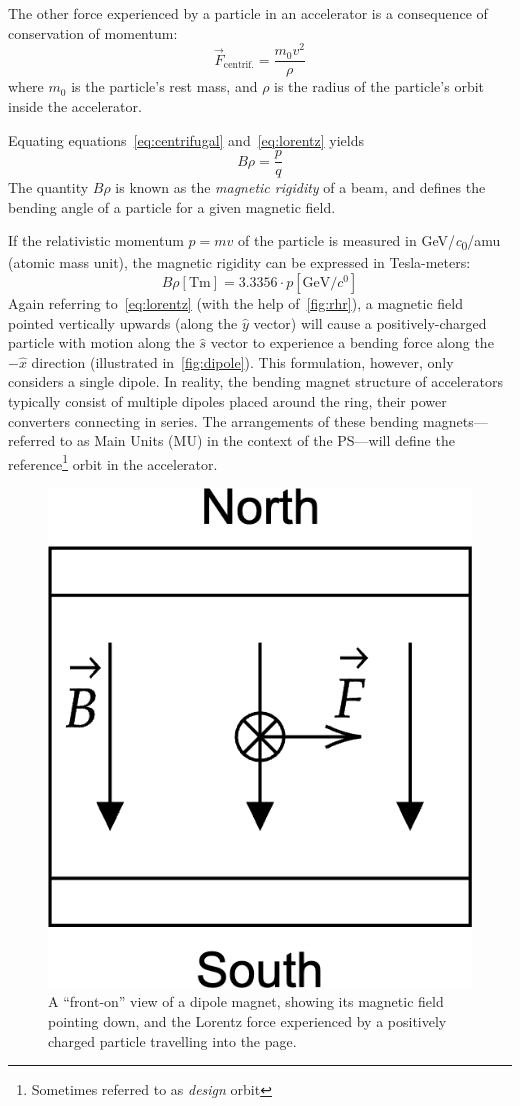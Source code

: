 \documentclass[11pt]{report}
\begin{document}
The other force experienced by a particle in an accelerator is a consequence of conservation of momentum:
\begin{equation}
\vec F_{\text{centrif.}}=\frac{m_0v^2}{\rho}\label{eq:centrifugal}
\end{equation} where $m_0$ is the particle's rest mass, and $\rho$ is the radius of the particle's orbit inside the accelerator.

Equating equations~\ref{eq:centrifugal} and~\ref{eq:lorentz} yields
\begin{equation}
B\rho=\frac pq
\label{eq:brho}
\end{equation}
The quantity $B\rho$ is known as the \textit{magnetic rigidity} of a beam, and defines the bending angle of a particle for a given magnetic field. 

If the relativistic momentum $p=mv$ of the particle is measured in \unit[per-mode = symbol]{\GeV\per\clight\per amu} (atomic mass unit), the magnetic rigidity can be expressed in Tesla-meters:
\begin{equation}
B\rho \left[\unit{\tesla\meter}\right] = 3.3356\cdot p\left[\unit{\giga\electronvolt\per\clight}\right]
\label{tesla-meters}
\end{equation} %
Again referring to~\autoref{eq:lorentz} (with the help of~\autoref{fig:rhr}), a magnetic field pointed vertically upwards (along the $\hat y$ vector) will cause a positively-charged particle with motion along the $\hat s$ vector to experience a bending force along the $-\hat x$ direction (illustrated in~\autoref{fig:dipole}). This formulation, however, only considers a single dipole. In reality, the bending magnet structure of accelerators typically consist of multiple dipoles placed around the ring, their power converters connecting in series. The arrangements of these bending magnets---referred to as Main Units (MU) in the context of the PS---will define the reference\footnote{Sometimes referred to as \textit{design} orbit} orbit in the accelerator.

\begin{figure}[h]
  \centering
  \includegraphics*[width=0.2\linewidth]{dipole-bending.png}
  \caption{A ``front-on'' view of a dipole magnet, showing its magnetic field pointing down, and the Lorentz force experienced by a positively charged particle travelling into the page.}\label{fig:dipole}
\end{figure}
\end{document}
